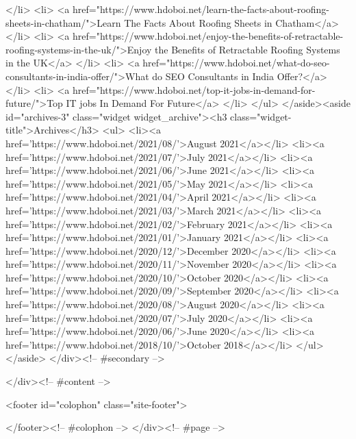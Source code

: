 									</li>
											<li>
					<a href="https://www.hdoboi.net/learn-the-facts-about-roofing-sheets-in-chatham/">Learn The Facts About Roofing Sheets in Chatham</a>
									</li>
											<li>
					<a href="https://www.hdoboi.net/enjoy-the-benefits-of-retractable-roofing-systems-in-the-uk/">Enjoy the Benefits of Retractable Roofing Systems in the UK</a>
									</li>
											<li>
					<a href="https://www.hdoboi.net/what-do-seo-consultants-in-india-offer/">What do SEO Consultants in India Offer?</a>
									</li>
											<li>
					<a href="https://www.hdoboi.net/top-it-jobs-in-demand-for-future/">Top IT jobs In Demand For Future</a>
									</li>
					</ul>
		</aside><aside id="archives-3" class="widget widget_archive"><h3 class="widget-title">Archives</h3>		<ul>
				<li><a href='https://www.hdoboi.net/2021/08/'>August 2021</a></li>
	<li><a href='https://www.hdoboi.net/2021/07/'>July 2021</a></li>
	<li><a href='https://www.hdoboi.net/2021/06/'>June 2021</a></li>
	<li><a href='https://www.hdoboi.net/2021/05/'>May 2021</a></li>
	<li><a href='https://www.hdoboi.net/2021/04/'>April 2021</a></li>
	<li><a href='https://www.hdoboi.net/2021/03/'>March 2021</a></li>
	<li><a href='https://www.hdoboi.net/2021/02/'>February 2021</a></li>
	<li><a href='https://www.hdoboi.net/2021/01/'>January 2021</a></li>
	<li><a href='https://www.hdoboi.net/2020/12/'>December 2020</a></li>
	<li><a href='https://www.hdoboi.net/2020/11/'>November 2020</a></li>
	<li><a href='https://www.hdoboi.net/2020/10/'>October 2020</a></li>
	<li><a href='https://www.hdoboi.net/2020/09/'>September 2020</a></li>
	<li><a href='https://www.hdoboi.net/2020/08/'>August 2020</a></li>
	<li><a href='https://www.hdoboi.net/2020/07/'>July 2020</a></li>
	<li><a href='https://www.hdoboi.net/2020/06/'>June 2020</a></li>
	<li><a href='https://www.hdoboi.net/2018/10/'>October 2018</a></li>
		</ul>
			</aside>	</div><!-- #secondary -->

	</div><!-- #content -->

	
	<footer id="colophon" class="site-footer">
		
		
	</footer><!-- #colophon -->
</div><!-- #page -->

